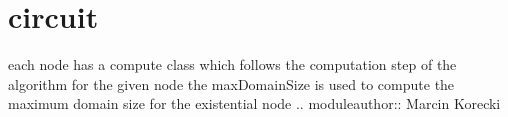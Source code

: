 \documentclass[letterpaper,10pt,english,openany,oneside]{sphinxmanual}
\begin{document}
\section{circuit}
\label{\detokenize{index:module-circuit}}\label{\detokenize{index:circuit}}\label{\detokenize{index:module-2}}
each node has a compute class which follows the computation step of the algorithm for the given node
the maxDomainSize is used to compute the maximum domain size for the existential node
.. moduleauthor:: Marcin Korecki
\end{document}
